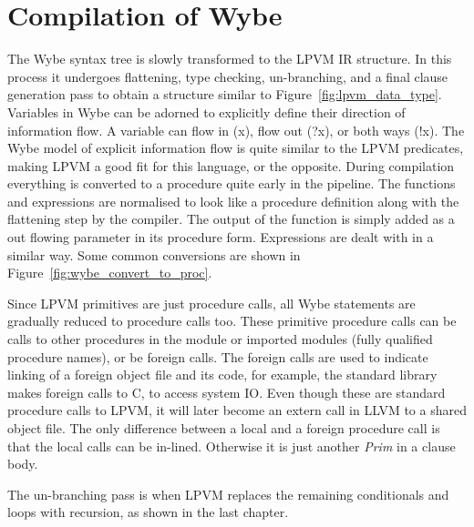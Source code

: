 \section{Compilation of Wybe}

The Wybe syntax tree is slowly transformed to the LPVM IR structure. In this
process it undergoes flattening, type checking, un-branching, and a final
clause generation pass to obtain a structure similar to
Figure~\ref{fig:lpvm_data_type}. Variables in Wybe can be adorned to explicitly
define their direction of information flow. A variable can flow in (x), flow
out (?x), or both ways (!x). The Wybe model of explicit information flow is
quite similar to the LPVM predicates, making LPVM a good fit for this language,
or the opposite. During compilation everything is converted to a procedure
quite early in the pipeline. The functions and expressions are normalised to
look like a procedure definition along with the flattening step by the
compiler. The output of the function is simply added as a out flowing parameter
in its procedure form. Expressions are dealt with in a similar way.  Some
common conversions are shown in Figure~\ref{fig:wybe_convert_to_proc}.

Since LPVM primitives are just procedure calls, all Wybe statements are
gradually reduced to procedure calls too. These primitive procedure calls can
be calls to other procedures in the module or imported modules (fully qualified
procedure names), or be foreign calls. The foreign calls are used to indicate
linking of a foreign object file and its code, for example, the standard
library makes foreign calls to C, to access system IO. Even though these are
standard procedure calls to LPVM, it will later become an extern call in LLVM
to a shared object file. The only difference between a local and a foreign
procedure call is that the local calls can be in-lined. Otherwise it is just
another \textit{Prim} in a clause body.

The un-branching pass is when LPVM replaces the remaining conditionals and
loops with recursion, as shown in the last chapter. 



